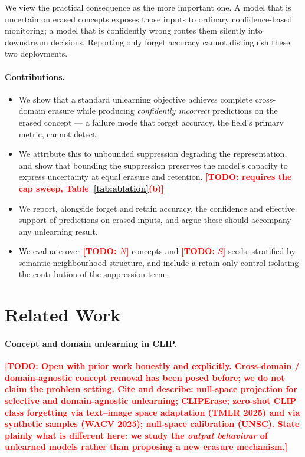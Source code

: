 \documentclass[10pt]{article}
\newcommand{\todo}[1]{\textcolor{red}{\textbf{[TODO: #1]}}}
\begin{document}
We view the practical consequence as the more important one. A model that is
uncertain on erased concepts exposes those inputs to ordinary confidence-based
monitoring; a model that is confidently wrong routes them silently into
downstream decisions. Reporting only forget accuracy cannot distinguish these
two deployments.

\paragraph{Contributions.}
\begin{itemize}
  \item We show that a standard unlearning objective achieves complete
        cross-domain erasure while producing \emph{confidently incorrect}
        predictions on the erased concept --- a failure mode that forget
        accuracy, the field's primary metric, cannot detect.
  \item We attribute this to unbounded suppression degrading the representation,
        and show that bounding the suppression preserves the model's capacity to
        express uncertainty at equal erasure and retention.
        \todo{requires the cap sweep, Table~\ref{tab:ablation}(b)}
  \item We report, alongside forget and retain accuracy, the confidence and
        effective support of predictions on erased inputs, and argue these should
        accompany any unlearning result.
  \item We evaluate over \todo{$N$} concepts and \todo{$S$} seeds, stratified by
        semantic neighbourhood structure, and include a retain-only control
        isolating the contribution of the suppression term.
\end{itemize}

\section{Related Work}
\label{sec:related}

\paragraph{Concept and domain unlearning in CLIP.}
\todo{Open with prior work honestly and explicitly. Cross-domain / domain-agnostic
concept removal has been posed before; we do not claim the problem setting. Cite
and describe: null-space projection for selective and domain-agnostic unlearning;
CLIPErase; zero-shot CLIP class forgetting via text--image space adaptation
(TMLR 2025) and via synthetic samples (WACV 2025); null-space calibration (UNSC).
State plainly what is different here: we study the \emph{output behaviour} of
unlearned models rather than proposing a new erasure mechanism.}
\end{document}
